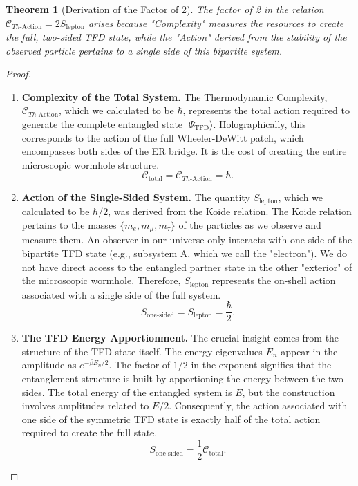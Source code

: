 \documentclass[11pt, letterpaper]{report}
\theoremstyle{plain} %
\newtheorem{theorem}{Theorem}[chapter]
\theoremstyle{definition} %
\theoremstyle{remark} %
\begin{document}
\begin{theorem}[Derivation of the Factor of 2]
The factor of 2 in the relation $\mathcal{C}_{Th\text{-Action}} = 2 S_{\text{lepton}}$ arises because "Complexity" measures the resources to create the full, two-sided TFD state, while the "Action" derived from the stability of the observed particle pertains to a single side of this bipartite system.
\end{theorem}
\begin{proof}
\begin{enumerate}
    \item \textbf{Complexity of the Total System.} The Thermodynamic Complexity, $\mathcal{C}_{Th\text{-Action}}$, which we calculated to be $\hbar$, represents the total action required to generate the complete entangled state $|\Psi_{\text{TFD}}\rangle$. Holographically, this corresponds to the action of the full Wheeler-DeWitt patch, which encompasses both sides of the ER bridge. It is the cost of creating the entire microscopic wormhole structure.
    \begin{equation}
        \mathcal{C}_{\text{total}} = \mathcal{C}_{Th\text{-Action}} = \hbar.
    \end{equation}

    \item \textbf{Action of the Single-Sided System.} The quantity $S_{\text{lepton}}$, which we calculated to be $\hbar/2$, was derived from the Koide relation. The Koide relation pertains to the masses $\{m_e, m_\mu, m_\tau\}$ of the particles as we observe and measure them. An observer in our universe only interacts with one side of the bipartite TFD state (e.g., subsystem A, which we call the "electron"). We do not have direct access to the entangled partner state in the other "exterior" of the microscopic wormhole. Therefore, $S_{\text{lepton}}$ represents the on-shell action associated with a single side of the full system.
    \begin{equation}
        S_{\text{one-sided}} = S_{\text{lepton}} = \frac{\hbar}{2}.
    \end{equation}
    
    \item \textbf{The TFD Energy Apportionment.} The crucial insight comes from the structure of the TFD state itself. The energy eigenvalues $E_n$ appear in the amplitude as $e^{-\beta E_n/2}$. The factor of $1/2$ in the exponent signifies that the entanglement structure is built by apportioning the energy between the two sides. The total energy of the entangled system is $E$, but the construction involves amplitudes related to $E/2$. Consequently, the action associated with one side of the symmetric TFD state is exactly half of the total action required to create the full state.
    \begin{equation}
        S_{\text{one-sided}} = \frac{1}{2} \mathcal{C}_{\text{total}}.
    \end{equation}


\end{enumerate}
\end{proof}
\end{document}
